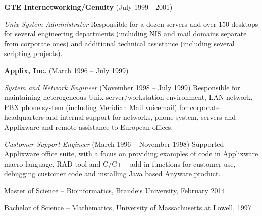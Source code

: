 \documentclass[11pt,article,oneside]{memoir}
\begin{document}
\ind \textbf{GTE Internetworking/Genuity} (July 1999 - 2001)

\noindent\textit{Unix System Administrator} Responsible for a dozen servers and over 150 desktops for several engineering departments (including NIS and mail domains separate from corporate ones) and additional technical assistance (including several scripting projects).

\ind \textbf{Applix, Inc.} (March 1996 -- July 1999)

\noindent\textit{System and Network Engineer} (November 1998 -- July 1999) Responsible for maintaining heterogeneous Unix server/workstation environment, LAN network, PBX phone system (including Meridian Mail voicemail) for corporate headquarters and internal support for networks, phone system, servers and Applixware and remote assistance to European offices.

\noindent\textit{Customer Support Engineer} (March 1996 -- November 1998) Supported Applixware office suite, with a focus on providing examples of code in Applixware macro language, RAD tool and C/C++ add-in functions for customer use, debugging customer code and installing Java based Anyware product.

\bigskip



\ind Master of Science -- Bioinformatics, Brandeis University, February 2014

\ind Bachelor of Science -- Mathematics, University of Massachusetts at Lowell, 1997
\end{document}
